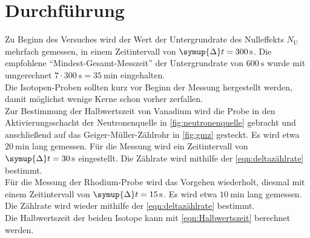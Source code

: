 \section{Durchführung} \label{sec:durchfuehrung}

Zu Beginn des Versuches wird der Wert der Untergrundrate des Nulleffekts $N_\text{U}$ mehrfach gemessen,
in einem Zeitintervall von $\symup{\Delta}t = \SI{300}{\second}$.
Die empfohlene \enquote{Mindest-Gesamt-Messzeit} der Untergrundrate von $\SI{600}{\second}$
wurde mit umgerechnet $7 \cdot \SI{300}{\second} = \SI{35}{\minute}$ eingehalten.\\
Die Isotopen-Proben sollten kurz vor Beginn der Messung hergestellt werden,
damit möglichst wenige Kerne schon vorher zerfallen.\\
Zur Bestimmung der Halbwertszeit von Vanadium wird die Probe
in den Aktivierungsschacht der Neutronenquelle in \autoref{fig:neutronenquelle} gebracht
und anschließend auf das Geiger-Müller-Zählrohr in \autoref{fig:gmz} gesteckt.
Es wird etwa $\SI{20}{\minute}$ lang gemessen. %
Für die Messung wird ein Zeitintervall von $\symup{\Delta}t = \SI{30}{\second}$ eingestellt.
Die Zählrate wird mithilfe der \autoref{eqn:deltazählrate} bestimmt.\\
Für die Messung der Rhodium-Probe wird das Vorgehen wiederholt,
diesmal mit einem Zeitintervall von $\symup{\Delta}t = \SI{15}{\second}$.
Es wird etwa $\SI{10}{\minute}$ lang gemessen. %
Die Zählrate wird wieder mithilfe der \autoref{eqn:deltazählrate} bestimmt.\\
Die Halbwertszeit der beiden Isotope kann mit \autoref{eqn:Halbwertszeit} berechnet werden.
